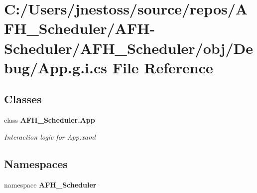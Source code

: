 \section{C\+:/\+Users/jnestoss/source/repos/\+A\+F\+H\+\_\+\+Scheduler/\+A\+F\+H-\/\+Scheduler/\+A\+F\+H\+\_\+\+Scheduler/obj/\+Debug/\+App.g.\+i.\+cs File Reference}
\label{_debug_2_app_8g_8i_8cs}
\subsection*{Classes}
\begin{DoxyCompactItemize}
\item 
class \textbf{ A\+F\+H\+\_\+\+Scheduler.\+App}
\begin{DoxyCompactList}\small\item\em Interaction logic for App.\+xaml \end{DoxyCompactList}\end{DoxyCompactItemize}
\subsection*{Namespaces}
\begin{DoxyCompactItemize}
\item 
namespace \textbf{ A\+F\+H\+\_\+\+Scheduler}
\end{DoxyCompactItemize}
